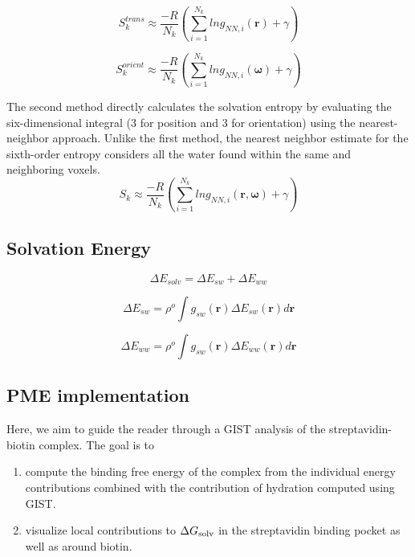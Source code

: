 \documentclass[9pt,tutorial]{livecoms}
\newcommand{\dgsolv}{\Delta G_\textup{solv}}
\begin{document}
\begin{equation}
	S_{k}^\textit{trans} \approx \frac{-R}{N_\textit{k}} \left( \sum _{i=1}^{N_k} ln g_{NN, \textit{i}} \left( \textbf{r} \right) + \gamma \right)
\end{equation}


\begin{equation}
	S_{k}^\textit{orient} \approx \frac{-R}{N_\textit{k}} \left( \sum _{i=1}^{N_k} ln g_{NN, \textit{i}} \left( \mathbf {\omega} \right) + \gamma \right)
\end{equation}

The second method directly calculates the solvation entropy by evaluating the six-dimensional integral (3 for position and 3 for orientation) 
using the nearest-neighbor approach. Unlike the first method, the nearest neighbor estimate for the sixth-order entropy considers all the water 
found within the same and neighboring voxels.  
\begin{equation}
	S_\textit{k} \approx \frac{-R}{N_\textit{k}} \left( \sum _{i=1}^{N_k} ln g_{NN, \textit{i}} \left( \textbf{r}, \mathbf {\omega} \right) + \gamma \right)
\end{equation}


\subsection{Solvation Energy}
\begin{equation}
	\Delta E_\textit{solv} = \Delta E_\textit{sw} + \Delta E_\textit{ww}
\end{equation}

\begin{equation}
	\Delta E_\textit{sw} = \rho^\textit{o} \int g_\textit{sw}\left(\textbf{r}\right) \Delta E_\textit{sw} \left(\textbf{r}\right) d\textbf{r}
\end{equation}

\begin{equation}
	\Delta E_\textit{ww} = \rho^\textit{o} \int g_\textit{sw}\left(\textbf{r}\right) \Delta E_\textit{ww} \left(\textbf{r}\right) d\textbf{r}
\end{equation}

\subsection{PME implementation}

Here, we aim to guide the reader through a GIST analysis of the streptavidin-biotin complex. The goal is to
\begin{enumerate}
	\item compute the binding free energy of the complex from the individual energy contributions combined with the contribution of hydration computed using GIST.
	\item visualize local contributions to $\dgsolv$ in the streptavidin binding pocket as well as around biotin.
\end{enumerate}
\end{document}
